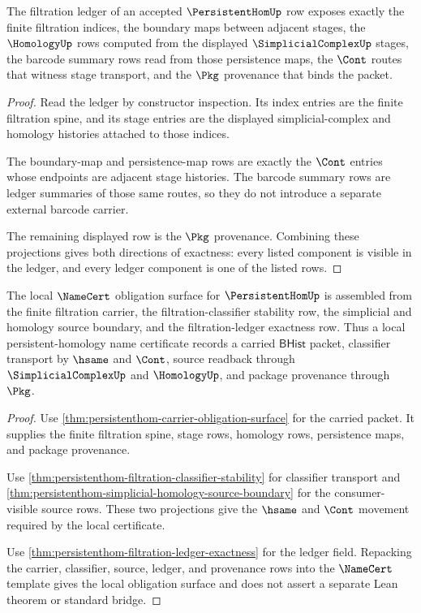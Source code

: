 \begin{theorem}
\label{thm:persistenthom-filtration-ledger-exactness}
The filtration ledger of an accepted $\PersistentHomUp$ row exposes exactly the
finite filtration indices, the boundary maps between adjacent stages, the
$\HomologyUp$ rows computed from the displayed $\SimplicialComplexUp$ stages,
the barcode summary rows read from those persistence maps, the $\Cont$ routes
that witness stage transport, and the $\Pkg$ provenance that binds the packet.
\end{theorem}
\begin{proof}
Read the ledger by constructor inspection. Its index entries are the finite
filtration spine, and its stage entries are the displayed simplicial-complex
and homology histories attached to those indices.

The boundary-map and persistence-map rows are exactly the $\Cont$ entries whose
endpoints are adjacent stage histories. The barcode summary rows are ledger
summaries of those same routes, so they do not introduce a separate external
barcode carrier.

The remaining displayed row is the $\Pkg$ provenance. Combining these
projections gives both directions of exactness: every listed component is
visible in the ledger, and every ledger component is one of the listed rows.
\end{proof}

\begin{theorem}
\label{thm:persistenthom-local-namecert-surface}
The local $\NameCert$ obligation surface for $\PersistentHomUp$ is assembled
from the finite filtration carrier, the filtration-classifier stability row,
the simplicial and homology source boundary, and the filtration-ledger
exactness row. Thus a local persistent-homology name certificate records a
carried $\mathsf{BHist}$ packet, classifier transport by $\hsame$ and $\Cont$,
source readback through $\SimplicialComplexUp$ and $\HomologyUp$, and package
provenance through $\Pkg$.
\end{theorem}
\begin{proof}
Use \autoref{thm:persistenthom-carrier-obligation-surface} for the carried
packet. It supplies the finite filtration spine, stage rows, homology rows,
persistence maps, and package provenance.

Use \autoref{thm:persistenthom-filtration-classifier-stability} for classifier
transport and \autoref{thm:persistenthom-simplicial-homology-source-boundary}
for the consumer-visible source rows. These two projections give the
$\hsame$ and $\Cont$ movement required by the local certificate.

Use \autoref{thm:persistenthom-filtration-ledger-exactness} for the ledger
field. Repacking the carrier, classifier, source, ledger, and provenance rows
into the $\NameCert$ template gives the local obligation surface and does not
assert a separate Lean theorem or standard bridge.
\end{proof}

